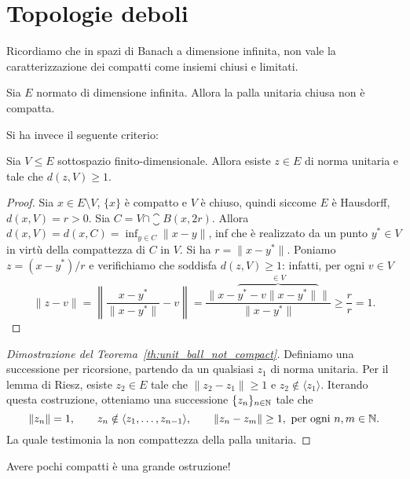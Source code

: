 \chapter{Topologie deboli}
Ricordiamo che in spazi di Banach a dimensione infinita, non vale la caratterizzazione dei compatti come insiemi chiusi e limitati.

\begin{theorem}
\label{th:unit_ball_not_compact}
	Sia $E$ normato di dimensione infinita.
	Allora la palla unitaria chiusa non è compatta.
\end{theorem}

Si ha invece il seguente criterio:

\begin{lemma}[Riesz]
\label{lemma:riesz}
	Sia $V \leq E$ sottospazio finito-dimensionale.
	Allora esiste $z \in E$ di norma unitaria e tale che $d(z, V) \geq 1$.
\end{lemma}
\begin{proof}
	Sia $x \in E \setminus V$, $\{x\}$ è compatto e $V$ è chiuso, quindi siccome $E$ è Hausdorff, $d(x,V) = r>0$.
	Sia $C = V \cap \closure B(x, 2r)$. Allora $d(x, V) = d(x, C) = \inf_{y \in C} \|x-y\|$, inf che è realizzato da un punto $y^* \in V$ in virtù della compattezza di $C$ in $V$. Si ha $r = \|x-y^*\|$. Poniamo $z = (x-y^*)/r$ e verifichiamo che soddisfa $d(z, V) \geq 1$: infatti, per ogni $v \in V$
	\begin{equation*}
		\|z-v\| = \left\| \frac{x-y^*}{\|x-y^*\|} - v \right\| = \frac{\|x-\overbrace{y^* - v\|x-y^*\|}^{\in V}\|}{\|x-y^*\|} \geq \frac{r}r =1.
	\end{equation*}
\end{proof}

\begin{proof}[Dimostrazione del Teorema~\ref{th:unit_ball_not_compact}]
	Definiamo una successione per ricorsione, partendo da un qualsiasi $z_1$ di norma unitaria. Per il lemma di Riesz, esiste $z_2 \in E$ tale che $\|z_2 - z_1\| \geq 1$ e $z_2 \notin \langle z_1 \rangle$. Iterando questa costruzione, otteniamo una successione $\{z_n\}_{n \in \mathbb{N}}$ tale che
	\begin{equation*}
		\|z_n\| =1, \qquad z_n \notin \langle z_1, \ldots, z_{n-1}\rangle, \qquad \|z_n - z_m\| \geq 1,\ \text{per ogni $n, m \in \mathbb{N}$}.
	\end{equation*}
	La quale testimonia la non compattezza della palla unitaria.
\end{proof}

Avere pochi compatti è una grande ostruzione!

